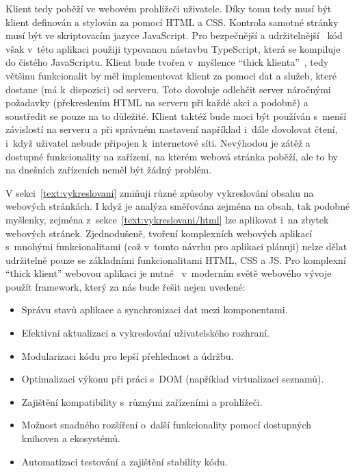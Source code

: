 Klient tedy poběží ve webovém prohlížeči uživatele.
Díky tomu tedy musí být klient definován a stylován za pomocí HTML a CSS.
Kontrola samotné stránky musí být ve skriptovacím jazyce JavaScript.
Pro bezpečnější a udržitelnější~\cite{typescript_docs} kód však v~této aplikaci použiji typovanou nástavbu TypeScript, která se kompiluje do čistého JavaScriptu.
Klient bude tvořen v~myšlence \enquote{thick klienta}~\cite{uzayr2022frontend}, tedy většinu funkcionalit by měl implementovat klient za pomoci dat a služeb, které dostane (má k~dispozici) od serveru.
Toto dovoluje odlehčit server náročnými požadavky (překreslením HTML na serveru při každé akci a podobně) a soustředit se pouze na to důležité.
Klient taktéž bude moci být používán s~menší závislostí na serveru a při správném nastavení například i~dále dovolovat čtení, i~když uživatel nebude připojen k~internetové síti.
Nevýhodou je zátěž a dostupné funkcionality na zařízení, na kterém webová stránka poběží, ale to by na dnešních zařízeních neměl být žádný problém.

V sekci~\ref{text:vykreslovani} zmiňuji různé způsoby vykreslování obsahu na webových stránkách.
I když je analýza směřována zejména na obsah, tak podobné myšlenky, zejména z~sekce~\ref{text:vykreslovani/html} lze aplikovat i~na zbytek webových stránek.
Zjednodušeně, tvoření komplexních webových aplikací s~mnohými funkcionalitami (což v~tomto návrhu pro aplikaci plánuji) nelze dělat udržitelně pouze se základními funkcionalitami HTML, CSS a JS.
Pro komplexní \enquote{thick klient} webovou aplikaci je nutné~\cite{uzayr2022frontend} v~moderním světě webového vývoje použít framework, který za nás bude řešit nejen uvedené:

\begin{itemize}
    \item Správu stavů aplikace a synchronizaci dat mezi komponentami.
    \item Efektivní aktualizaci a vykreslování uživatelského rozhraní.
    \item Modularizaci kódu pro lepší přehlednost a údržbu.
    \item Optimalizaci výkonu při práci s~DOM (například virtualizaci seznamů).
    \item Zajištění kompatibility s~různými zařízeními a prohlížeči.
    \item Možnost snadného rozšíření o~další funkcionality pomocí dostupných knihoven a ekosystémů.
    \item Automatizaci testování a zajištění stability kódu.
\end{itemize}

